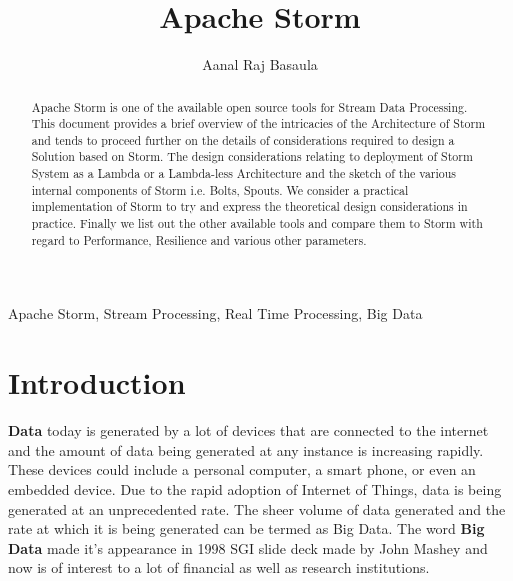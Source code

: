 \documentclass[runningheads,a4paper]{llncs}[2015/06/24]
\begin{document}
\title{Apache Storm}

\author{Aanal Raj Basaula}






\frontpageen %

\thispagestyle{empty}
\cleardoublepage

\maketitle

\begin{abstract}
Apache Storm is one of the available open source tools for Stream Data Processing. This document provides a brief overview of the intricacies of the Architecture of Storm and tends to proceed further on the details of considerations required to design a Solution based on Storm. The design considerations relating to deployment of Storm System as a Lambda or a Lambda-less Architecture and the sketch of the various internal components of Storm i.e. Bolts, Spouts. We consider a practical implementation of Storm to try and express the theoretical design considerations in practice. Finally we list out the other available tools and compare them to Storm with regard to Performance, Resilience and various other parameters.
\end{abstract}

\begin{keywords}
Apache Storm, Stream Processing, Real Time Processing, Big Data
\end{keywords}

\section{Introduction}

\textbf{Data} today is generated by a lot of devices that are connected to the internet and the amount of data being generated at any instance is increasing rapidly. These devices could include a personal computer, a smart phone, or even an embedded device. Due to the rapid adoption of Internet of Things, data is being generated at an unprecedented rate. The sheer volume of data generated and the rate at which it is being generated can be termed as Big Data. The word \textbf{Big Data} made it's appearance in 1998 SGI slide deck made by John Mashey and now is of interest to a lot of financial as well as research institutions.\cite{miningstatus}
\end{document}
